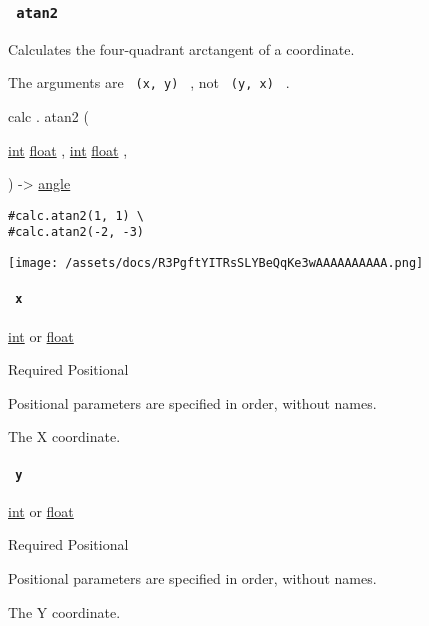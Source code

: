 \subsubsection{\texorpdfstring{\texttt{\ atan2\ }}{ atan2 }}\label{functions-atan2}

Calculates the four-quadrant arctangent of a coordinate.

The arguments are \texttt{\ (x,\ y)\ } , not \texttt{\ (y,\ x)\ } .

calc { . } { atan2 } (

{ \href{/docs/reference/foundations/int/}{int}
\href{/docs/reference/foundations/float/}{float} , } {
\href{/docs/reference/foundations/int/}{int}
\href{/docs/reference/foundations/float/}{float} , }

) -\textgreater{} \href{/docs/reference/layout/angle/}{angle}

\begin{verbatim}
#calc.atan2(1, 1) \
#calc.atan2(-2, -3)
\end{verbatim}

\texttt{[image: /assets/docs/R3PgftYITRsSLYBeQqKe3wAAAAAAAAAA.png]}

\paragraph{\texorpdfstring{\texttt{\ x\ }}{ x }}\label{functions-atan2-x}

\href{/docs/reference/foundations/int/}{int} {or}
\href{/docs/reference/foundations/float/}{float}

{Required} {{ Positional }}

\label{functions-atan2-x-positional-tooltip}
Positional parameters are specified in order, without names.

The X coordinate.

\paragraph{\texorpdfstring{\texttt{\ y\ }}{ y }}\label{functions-atan2-y}

\href{/docs/reference/foundations/int/}{int} {or}
\href{/docs/reference/foundations/float/}{float}

{Required} {{ Positional }}

\label{functions-atan2-y-positional-tooltip}
Positional parameters are specified in order, without names.

The Y coordinate.

